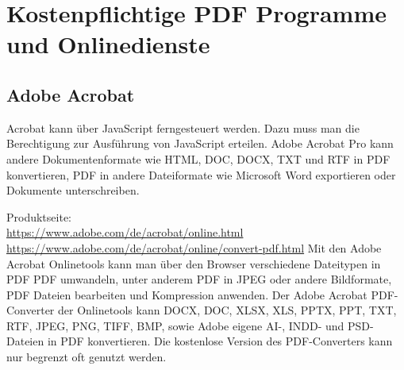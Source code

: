 \section{Kostenpflichtige PDF Programme und Onlinedienste}

\subsection{Adobe Acrobat}
Acrobat kann über JavaScript ferngesteuert werden. Dazu muss man die Berechtigung zur Ausführung von JavaScript erteilen. \cite{schneeberger}
Adobe Acrobat Pro kann andere Dokumentenformate wie HTML, DOC, DOCX, TXT und RTF in PDF konvertieren, PDF in andere Dateiformate wie Microsoft Word exportieren oder Dokumente unterschreiben. \cite{adobe-formate}
\par
Produktseite: \\
\url{https://www.adobe.com/de/acrobat/online.html} \\
\url{https://www.adobe.com/de/acrobat/online/convert-pdf.html}
Mit den Adobe Acrobat Onlinetools kann man über den Browser verschiedene Dateitypen in PDF PDF umwandeln, unter anderem PDF in JPEG oder andere Bildformate, PDF Dateien bearbeiten und Kompression anwenden.
Der Adobe Acrobat PDF-Converter der Onlinetools kann DOCX, DOC, XLSX, XLS, PPTX, PPT, TXT, RTF, JPEG, PNG, TIFF, BMP, sowie Adobe eigene AI-, INDD- und PSD-Dateien in PDF konvertieren. \cite{adobe-formate} Die kostenlose Version des PDF-Converters kann nur begrenzt oft genutzt werden.


